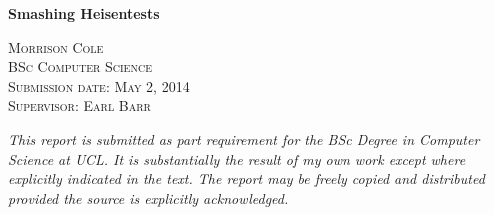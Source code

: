 \label{sec:title}

\begin{titlepage}
\begin{center}

{\huge \bfseries Smashing Heisentests \\[3cm]}

\textsc{\LARGE Morrison Cole}\\[0.5cm]
\textsc{\large BSc Computer Science}\\[0.3cm]
\textsc{\large Submission date: May 2, 2014}\\[2cm]

\textsc{\LARGE Supervisor: Earl Barr}\\[0.5cm]

\vfill

{\itshape This report is submitted as part requirement for the BSc Degree in Computer Science at UCL. It is substantially the result of my own work except where explicitly indicated in the text. The report may be freely copied and distributed provided the source is explicitly acknowledged.}

\end{center}
\end{titlepage}
